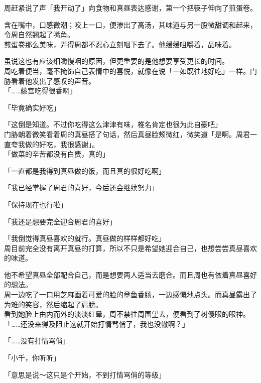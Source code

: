 周赶紧说了声「我开动了」向食物和真昼表达感谢，第一个把筷子伸向了煎蛋卷。

含在嘴中，口感微潮；咬上一口，便渗出了高汤，其味道与另一股微甜调和起来，令周自然翘起了嘴角。\\

煎蛋卷那么美味，弄得周都不忍心立刻咽下去了。他缓缓咀嚼着，品味着。

虽说这也有应该细嚼慢咽的原因，但更重要的是他想要享受更长的时间。\\

周吃着便当，毫不掩饰自己表情中的喜悦，就像在说「一如既往地好吃」一样。门胁看着他发出了感叹的声音。\\

「……藤宫吃得很香啊」

「毕竟确实好吃」

「这倒是知道。不过你吃得这么津津有味，椎名肯定也很为此自豪吧」\\

门胁朝着微笑看着周的真昼搭了句话，然后真昼脸颊微红，微笑道「是啊。周君一直夸我做的好吃，我很感谢」。\\

「做菜的辛苦都没有白费，真的」

「一直都是我得到真昼做的饭，而且真的很好吃啊」

「我已经掌握了周君的喜好，今后还会继续努力」

「保持现在也行啦」

「我还是想要完全迎合周君的喜好」

「我倒觉得真昼喜欢的就行。真昼做的样样都好吃」\\

周目前完全没有离开真昼的打算，所以不只是希望她迎合自己，也想尝尝真昼喜欢的味道。

他不希望真昼全部配合自己，而是想要两人适当去磨合。而且周也有依着真昼喜好的想法。\\

周一边吃了一口用芝麻画着可爱的脸的章鱼香肠，一边感慨地点头。而真昼露出了为难的笑容，然后缩起了肩膀。\\

看到她脸上由内而外的淡淡红晕，周不禁往周围望去，便看到了树傻眼的眼神。\\

「……还没来得及阻止这就开始打情骂俏了，我也没辙啊？」

「……没有打情骂俏」

「小千，你听听」

「意思是说～这只是个开始，不到打情骂俏的等级」

